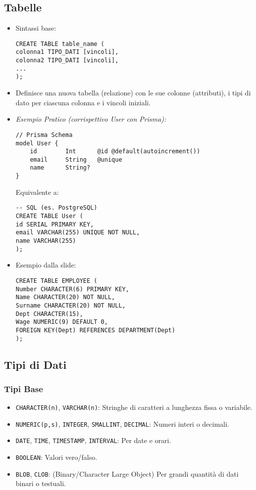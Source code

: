 \subsection{Tabelle}
\begin{itemize}
	\item Sintassi base:
	\begin{verbatim}
CREATE TABLE table_name (
colonna1 TIPO_DATI [vincoli],
colonna2 TIPO_DATI [vincoli],
...
);
	\end{verbatim}
	\item Definisce una nuova tabella (relazione) con le sue colonne (attributi), i tipi di dato per ciascuna colonna e i vincoli iniziali.
	\item \textit{Esempio Pratico (corrispettivo User con Prisma):}
	\begin{verbatim}
// Prisma Schema
model User {
	id        Int      @id @default(autoincrement())
	email     String   @unique
	name      String?
}
	\end{verbatim}
	Equivalente a:
	\begin{verbatim}
-- SQL (es. PostgreSQL)
CREATE TABLE User (
id SERIAL PRIMARY KEY,
email VARCHAR(255) UNIQUE NOT NULL,
name VARCHAR(255)
);
	\end{verbatim}
	\item Esempio dalla slide:
	\begin{verbatim}
CREATE TABLE EMPLOYEE (
Number CHARACTER(6) PRIMARY KEY,
Name CHARACTER(20) NOT NULL,
Surname CHARACTER(20) NOT NULL,
Dept CHARACTER(15),
Wage NUMERIC(9) DEFAULT 0,
FOREIGN KEY(Dept) REFERENCES DEPARTMENT(Dept)
);
	\end{verbatim}
\end{itemize}

\subsection{Tipi di Dati}
\subsubsection{Tipi Base}
\begin{itemize}
	\item \texttt{CHARACTER(n)}, \texttt{VARCHAR(n)}: Stringhe di caratteri a lunghezza fissa o variabile.
	\item \texttt{NUMERIC(p,s)}, \texttt{INTEGER}, \texttt{SMALLINT}, \texttt{DECIMAL}: Numeri interi o decimali.
	\item \texttt{DATE}, \texttt{TIME}, \texttt{TIMESTAMP}, \texttt{INTERVAL}: Per date e orari.
	\item \texttt{BOOLEAN}: Valori vero/falso.
	\item \texttt{BLOB}, \texttt{CLOB}: (Binary/Character Large Object) Per grandi quantità di dati binari o testuali.
\end{itemize}
